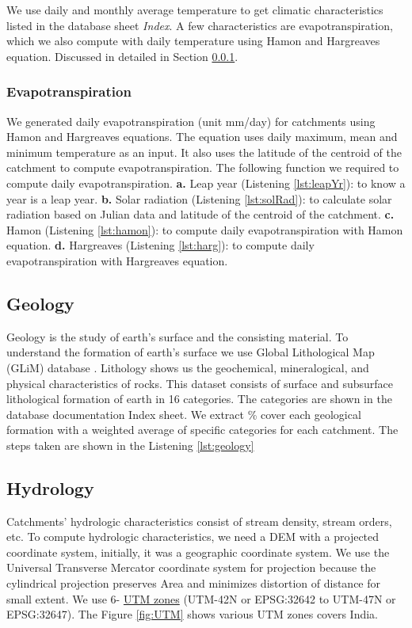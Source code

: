 \documentclass[a4paper, 12pt]{article}
\begin{document}
We use daily and monthly average temperature to get climatic characteristics listed in the database sheet \emph{Index}. A few characteristics are evapotranspiration, which we also compute with daily temperature using Hamon and Hargreaves equation. Discussed in detailed in Section \ref{sec:evapoTrans}.

\subsubsection{Evapotranspiration}\label{sec:evapoTrans}
We generated daily evapotranspiration (unit mm/day) for catchments using Hamon and Hargreaves equations. The equation uses daily maximum, mean and minimum temperature as an input. It also uses the latitude of the centroid of the catchment to compute evapotranspiration. The following function we required to compute daily evapotranspiration. \textbf{a.} Leap year (Listening \ref{lst:leapYr}): to know a year is a leap year. \textbf{b.} Solar radiation (Listening \ref{lst:solRad}): to calculate solar radiation based on Julian data and latitude of the centroid of the catchment. \textbf{c.} Hamon (Listening \ref{lst:hamon}): to compute daily evapotranspiration with Hamon equation. \textbf{d.} Hargreaves (Listening \ref{lst:harg}): to compute daily evapotranspiration with Hargreaves equation. 

\subsection{Geology}
Geology is the study of earth's surface and the consisting material. To understand the formation of earth's surface we use Global Lithological Map (GLiM) database \citep{hartmann2012new}. Lithology shows us the geochemical, mineralogical, and physical characteristics of rocks. This dataset consists of surface and subsurface lithological formation of earth in 16 categories. The categories are shown in the database documentation Index sheet. We extract \% cover each geological formation with a weighted average of specific categories for each catchment. The steps taken are shown in the Listening \ref{lst:geology}

\subsection{Hydrology}
Catchments' hydrologic characteristics consist of stream density, stream orders, etc. To compute hydrologic characteristics, we need a DEM with a projected coordinate system, initially, it was a geographic coordinate system. We use the Universal Transverse Mercator coordinate system for projection because the cylindrical projection preserves Area and minimizes distortion of distance for small extent. We use 6- \href{http://spatialreference.org/ref/epsg/32642/}{UTM zones} (UTM-42N or EPSG:32642 to UTM-47N or EPSG:32647). The Figure \ref{fig:UTM} shows various UTM zones covers India. 
\end{document}
